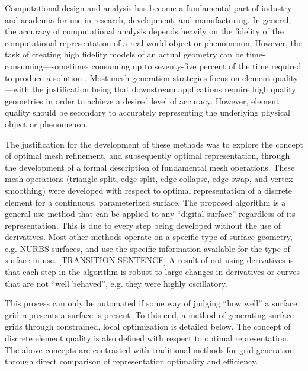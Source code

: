 Computational design and analysis has become a fundamental part of
industry and academia for use in research, development, and
manufacturing. In general, the accuracy of computational analysis
depends heavily on the fidelity of the computational representation of a
real-world object or phenomenon. However, the task of creating high
fidelity models of an actual geometry can be time-consuming---sometimes
consuming up to seventy-five percent of the time required to produce a
solution \cite{bischoff05}. Most mesh generation strategies focus on
element quality---with the justification being that downstream
applications require high quality geometries in order to achieve a
desired level of accuracy. However, element quality should be secondary
to accurately representing the underlying physical object or phenomenon.

The justification for the development of these methods was to explore
the concept of optimal mesh refinement, and subsequently optimal
representation, through the development of a formal description of
fundamental mesh operations. These mesh operations (triangle split, edge
 split, edge collapse, edge swap, and vertex smoothing) were
developed with respect to optimal representation of a discrete element
for a continuous, parameterized surface. The proposed algorithm is a
general-use method that can be applied to any ``digital surface''
regardless of its representation. This is due to every step being
developed without the use of derivatives. Most other methods operate on
a specific type of surface geometry, e.g. NURBS surfaces, and use the
specific information available for the type of surface in use.
[TRANSITION SENTENCE] A result of not using derivatives is that each
step in the algorithm is robust to large changes in derivatives or
curves that are not ``well behaved'', e.g. they were highly oscillatory.

This process can only be automated if some way of judging ``how well'' a
surface grid represents a surface is present. To this end, a method of
generating surface grids through constrained, local optimization is
detailed below. The concept of discrete element quality is also defined
with respect to optimal representation. The above concepts are
contrasted with traditional methods for grid generation through direct
comparison of representation optimality and efficiency.



